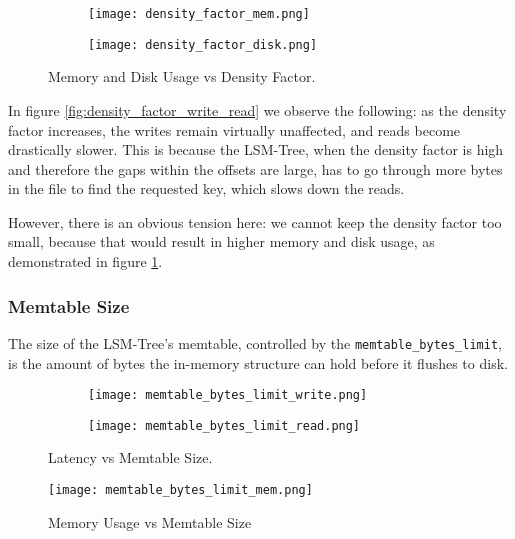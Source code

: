 \begin{figure}[h]
    \begin{subfigure}{.5\textwidth}
        \centering
        \texttt{[image: density\_factor\_mem.png]}
    \end{subfigure}
    \begin{subfigure}{.5\textwidth}
        \centering
        \texttt{[image: density\_factor\_disk.png]}
    \end{subfigure}
    \caption{Memory and Disk Usage vs Density Factor.}
    \label{fig:density_factor_mem_disk}
\end{figure}

In figure \ref{fig:density_factor_write_read} we observe the following: as the density factor increases, the writes remain virtually unaffected, and reads become drastically slower. This is because the LSM-Tree, when the density factor is high and therefore the gaps within the offsets are large, has to go through more bytes in the file to find the requested key, which slows down the reads.

However, there is an obvious tension here: we cannot keep the density factor too small, because that would result in higher memory and disk usage, as demonstrated in figure \ref{fig:density_factor_mem_disk}.

\subsubsection{Memtable Size}

The size of the LSM-Tree's memtable, controlled by the \verb"memtable_bytes_limit", is the amount of bytes the in-memory structure can hold before it flushes to disk.

\begin{figure}[h]
    \begin{subfigure}{.5\textwidth}
        \centering
        \texttt{[image: memtable\_bytes\_limit\_write.png]}
    \end{subfigure}
    \begin{subfigure}{.5\textwidth}
        \centering
        \texttt{[image: memtable\_bytes\_limit\_read.png]}
    \end{subfigure}
    \caption{Latency vs Memtable Size.}
    \label{fig:memtable-bytes-limit-write-read}
\end{figure}

\begin{figure}[h]
    \centering
    \texttt{[image: memtable\_bytes\_limit\_mem.png]}
    \caption{Memory Usage vs Memtable Size}
    \label{fig:memtable_bytes_limit_mem}
\end{figure}

